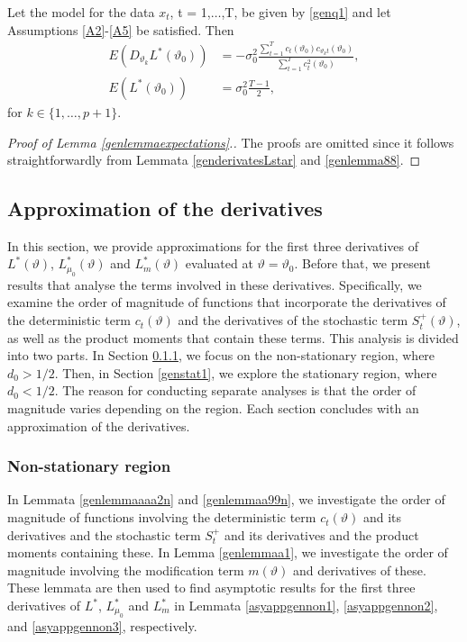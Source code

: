 {{\begin{lemma} \label{genlemmaexpectations}
Let the model for the data $x_t$, t = 1,$\ldots$,T, be given by \eqref{genq1} and let Assumptions \ref{A2}-\ref{A5} be satisfied. Then 
\begin{align}
  E\left( D_{\vartheta_k} L^*(\vartheta_0) \right) &= -\sigma^2_0 \frac{\sum_{t = 1}^T c_{t}(\vartheta_0) c_{\vartheta_k t}(\vartheta_0)}{\sum_{t = 1}^T c^2_{t}(\vartheta_0)}, \label{genEDLmu} \\
   E\left( L^*(\vartheta_0) \right) &=  \sigma^2_0 \frac{T-1}{2},  \label{genELmu}
\end{align}
for $k \in \{1,\ldots,p+1 \}$. 
\end{lemma}
\begin{proof}[Proof of Lemma \ref{genlemmaexpectations}.] The proofs are omitted since it follows straightforwardly from Lemmata \ref{genderivatesLstar} and \ref{genlemma88}.






\end{proof}
\subsection{Approximation of the derivatives} \label{ap3}

In this section, we provide approximations for the first three derivatives of $L^*(\vartheta)$, $L^*_{\mu_0}(\vartheta)$ and $L^*_{m}(\vartheta)$ evaluated at $\vartheta = \vartheta_0$. Before that, we present results that analyse the terms involved in these derivatives. Specifically, we examine the order of magnitude of functions that incorporate the derivatives of the deterministic term $c_{t}(\vartheta)$ and the derivatives of the stochastic term $S^+_t(\vartheta)$, as well as the product moments that contain these terms. This analysis is divided into two parts. In Section \ref{gennon1}, we focus on the non-stationary region, where $d_0 > 1/2$. Then, in Section \ref{genstat1}, we explore the stationary region, where $d_0 < 1/2$. The reason for conducting separate analyses is that the order of magnitude varies depending on the region. Each section concludes with an approximation of the derivatives.

\subsubsection{Non-stationary region}\label{gennon1}

In Lemmata \ref{genlemmaaaa2n} and \ref{genlemmaa99n}, we investigate the order of magnitude of functions involving the deterministic term $c_{t}(\vartheta)$ and its derivatives and the stochastic term $S^+_{t}$ and its derivatives and the product moments containing these. In Lemma \ref{genlemmaa1}, we investigate the order of magnitude involving the modification term $m(\vartheta)$ and derivatives of these. These lemmata are then used to find asymptotic results for the first three derivatives of $L^*$, $L^*_{\mu_0}$ and $L^*_{m}$ in Lemmata \ref{asyappgennon1}, \ref{asyappgennon2}, and \ref{asyappgennon3}, respectively.

}}
